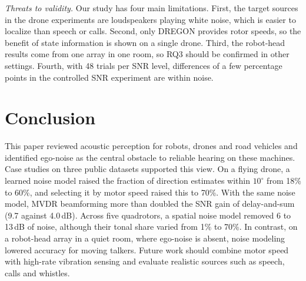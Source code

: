 \documentclass{svproc}
\begin{document}
\emph{Threats to validity.}
Our study has four main limitations.
First, the target sources in the drone experiments are loudspeakers playing white noise, which is easier to localize than speech or calls.
Second, only DREGON provides rotor speeds, so the benefit of state information is shown on a single drone.
Third, the robot-head results come from one array in one room, so RQ3 should be confirmed in other settings.
Fourth, with 48 trials per SNR level, differences of a few percentage points in the controlled SNR experiment are within noise.

\section{Conclusion}\label{sec:con}
This paper reviewed acoustic perception for robots, drones and road vehicles and identified ego-noise as the central obstacle to reliable hearing on these machines.
Case studies on three public datasets supported this view.
On a flying drone, a learned noise model raised the fraction of direction estimates within $10^\circ$ from 18\% to 60\%, and selecting it by motor speed raised this to 70\%.
With the same noise model, MVDR beamforming more than doubled the SNR gain of delay-and-sum (9.7 against 4.0\,dB).
Across five quadrotors, a spatial noise model removed 6 to 13\,dB of noise, although their tonal share varied from 1\% to 70\%.
In contrast, on a robot-head array in a quiet room, where ego-noise is absent, noise modeling lowered accuracy for moving talkers.
Future work should combine motor speed with high-rate vibration sensing and evaluate realistic sources such as speech, calls and whistles.
%
%
\renewcommand{\bibsection}{\section*{References}} %
\renewcommand{\bibfont}{\small}                    %
\setlength{\bibsep}{0pt}                          %


\end{document}
